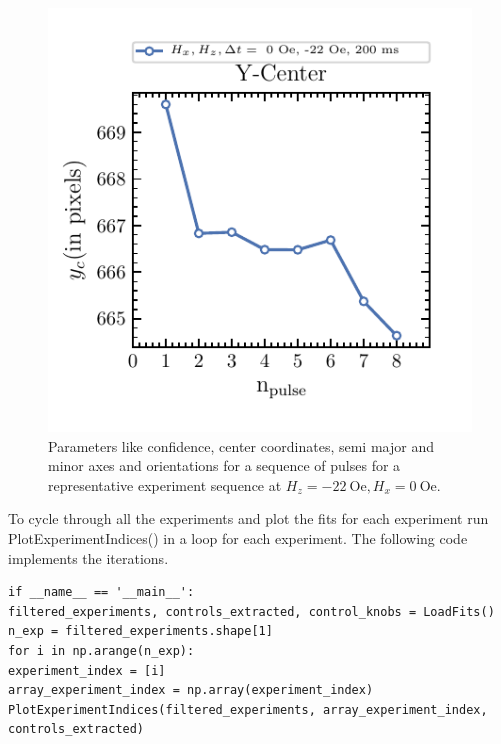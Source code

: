 \documentclass[12pt, twoside, a4paper]{article}
\begin{document}
\begin{figure}[!htbp]
	\includegraphics[scale=1.0]{figures/10_FitsSingleIteration/6__Y-Center.pdf}
	\caption{Parameters like confidence, center coordinates, semi major and minor axes and orientations for a sequence of pulses for a representative experiment sequence at $H_z = -22~\mathrm{Oe}, H_x = 0~\mathrm{Oe}$.
	}
	\label{openCV fits parameters single experiment}
\end{figure}
%

To cycle through all the experiments and plot the fits for each experiment run PlotExperimentIndices() in a loop for each experiment. The following code implements the iterations.
%
\begin{verbatim}
if __name__ == '__main__':
filtered_experiments, controls_extracted, control_knobs = LoadFits()
n_exp = filtered_experiments.shape[1]
for i in np.arange(n_exp):
experiment_index = [i]
array_experiment_index = np.array(experiment_index)
PlotExperimentIndices(filtered_experiments, array_experiment_index, controls_extracted)
\end{verbatim}
%
\end{document}
